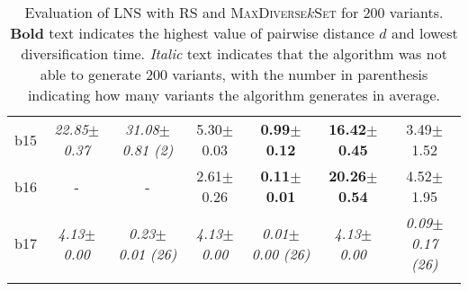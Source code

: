\begin{longtable}{|l|c|c|c|c|c|c|}
\\
b15&\textit{22.85$\pm$0.37} & \textit{31.08$\pm$0.81 (2)}&5.30$\pm$0.03 & \textbf{0.99$\pm$0.12}&\textbf{16.42$\pm$0.45} & 3.49$\pm$1.52
\\
b16&- & -&2.61$\pm$0.26 & \textbf{0.11$\pm$0.01}&\textbf{20.26$\pm$0.54} & 4.52$\pm$1.95
\\
b17&\textit{4.13$\pm$0.00} & \textit{0.23$\pm$0.01 (26)}&\textit{4.13$\pm$0.00} & \textit{0.01$\pm$0.00 (26)}&\textit{4.13$\pm$0.00} & \textit{0.09$\pm$0.17 (26)}
\\
\hline
\caption{\label{tab:dist_max_rs_lns} Evaluation of \ac{LNS} with \ac{RS} and \textsc{MaxDiverse$k$Set}
		for 200 variants. \textbf{Bold} text indicates the highest value of pairwise distance $d$
		and lowest diversification time. \textit{Italic} text indicates that the algorithm was not able to generate
		200 variants, with the number in parenthesis indicating how many variants the algorithm generates in average.}
\end{longtable}
